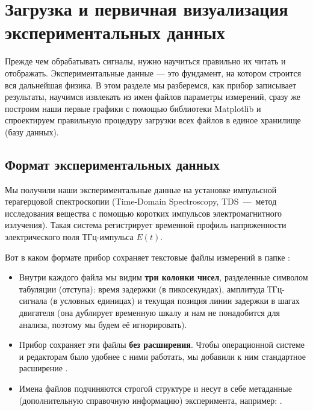 
\section{Загрузка и первичная визуализация экспериментальных данных}\label{sec:loading}

Прежде чем обрабатывать сигналы, нужно научиться правильно их читать и отображать. Экспериментальные данные — это фундамент, на котором строится вся дальнейшая физика. В этом разделе мы разберемся, как прибор записывает результаты, научимся извлекать из имен файлов параметры измерений, сразу же построим наши первые графики с помощью библиотеки Matplotlib и спроектируем правильную процедуру загрузки всех файлов в единое хранилище (базу данных).

\subsection{Формат экспериментальных данных}

Мы получили наши экспериментальные данные на установке импульсной терагерцовой спектроскопии (Time-Domain Spectroscopy, TDS~---~метод исследования вещества с помощью коротких импульсов электромагнитного излучения). Такая система регистрирует временной профиль напряженности электрического поля ТГц-импульса $E(t)$.

Вот в каком формате прибор сохраняет текстовые файлы измерений в папке :
\begin{itemize}
    \item Внутри каждого файла мы видим \textbf{три колонки чисел}, разделенные символом табуляции (отступа): время задержки (в пикосекундах), амплитуда ТГц-сигнала (в условных единицах) и текущая позиция линии задержки в шагах двигателя (она дублирует временную шкалу и нам не понадобится для анализа, поэтому мы будем её игнорировать).
    \item Прибор сохраняет эти файлы \textbf{без расширения}. Чтобы операционной системе и редакторам было удобнее с ними работать, мы добавили к ним стандартное расширение .
    \item Имена файлов подчиняются строгой структуре и несут в себе метаданные (дополнительную справочную информацию) эксперимента, например: .
\end{itemize}

